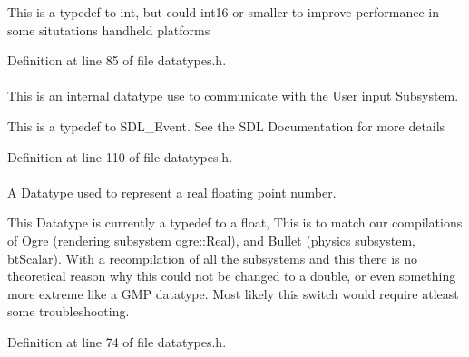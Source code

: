 This is a typedef to int, but could int16 or smaller to improve performance in some situtations handheld platforms 

Definition at line 85 of file datatypes.h.

\hypertarget{namespacephys_a8126d26e4507e66d09876988bb941fd4}{
\paragraph[{RawEvent}]{}\hfill}
\label{namespacephys_a8126d26e4507e66d09876988bb941fd4}


This is an internal datatype use to communicate with the User input Subsystem. 

This is a typedef to SDL\_\-Event. See the SDL Documentation for more details 

Definition at line 110 of file datatypes.h.

\hypertarget{namespacephys_af7eb897198d265b8e868f45240230d5f}{
\paragraph[{Real}]{}\hfill}
\label{namespacephys_af7eb897198d265b8e868f45240230d5f}


A Datatype used to represent a real floating point number. 

This Datatype is currently a typedef to a float, This is to match our compilations of Ogre (rendering subsystem ogre::Real), and Bullet (physics subsystem, btScalar). With a recompilation of all the subsystems and this there is no theoretical reason why this could not be changed to a double, or even something more extreme like a GMP datatype. Most likely this switch would require atleast some troubleshooting. 

Definition at line 74 of file datatypes.h.

\hypertarget{namespacephys_aa03900411993de7fbfec4789bc1d392e}{
\paragraph[{String}]{}\hfill}
\label{namespacephys_aa03900411993de7fbfec4789bc1d392e}


